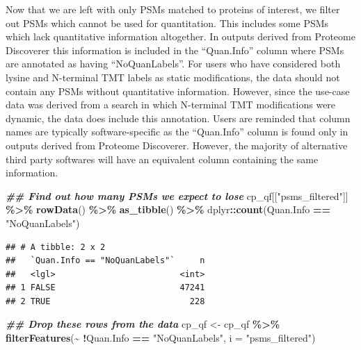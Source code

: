 \documentclass[9pt,a4paper,]{extarticle}
\newenvironment{Shaded}{\begin{snugshade}}{\end{snugshade}}
\newcommand{\AttributeTok}[1]{\textcolor[rgb]{0.13,0.29,0.53}{#1}}
\newcommand{\DocumentationTok}[1]{\textcolor[rgb]{0.56,0.35,0.01}{\textbf{\textit{#1}}}}
\newcommand{\FunctionTok}[1]{\textcolor[rgb]{0.13,0.29,0.53}{\textbf{#1}}}
\newcommand{\NormalTok}[1]{#1}
\newcommand{\OtherTok}[1]{\textcolor[rgb]{0.56,0.35,0.01}{#1}}
\newcommand{\SpecialCharTok}[1]{\textcolor[rgb]{0.81,0.36,0.00}{\textbf{#1}}}
\newcommand{\StringTok}[1]{\textcolor[rgb]{0.31,0.60,0.02}{#1}}
\begin{document}
Now that we are left with only PSMs matched to proteins of interest, we filter
out PSMs which cannot be used for quantitation. This includes some PSMs which
lack quantitative information altogether. In outputs derived from Proteome
Discoverer this information is included in the ``Quan.Info'' column where PSMs are
annotated as having ``NoQuanLabels''. For users who have considered both lysine and
N-terminal TMT labels as static modifications, the data should not contain any
PSMs without quantitative information. However, since the use-case data was
derived from a search in which N-terminal TMT modifications were dynamic, the
data does include this annotation. Users are reminded that column names are
typically software-specific as the ``Quan.Info'' column is found only in outputs
derived from Proteome Discoverer. However, the majority of alternative third
party softwares will have an equivalent column containing the same information.

\begin{Shaded}
\begin{Highlighting}[]
\DocumentationTok{\#\# Find out how many PSMs we expect to lose}
\NormalTok{cp\_qf[[}\StringTok{"psms\_filtered"}\NormalTok{]] }\SpecialCharTok{\%\textgreater{}\%} 
  \FunctionTok{rowData}\NormalTok{() }\SpecialCharTok{\%\textgreater{}\%} 
  \FunctionTok{as\_tibble}\NormalTok{() }\SpecialCharTok{\%\textgreater{}\%} 
\NormalTok{  dplyr}\SpecialCharTok{::}\FunctionTok{count}\NormalTok{(Quan.Info }\SpecialCharTok{==} \StringTok{"NoQuanLabels"}\NormalTok{)}
\end{Highlighting}
\end{Shaded}

\begin{verbatim}
## # A tibble: 2 x 2
##   `Quan.Info == "NoQuanLabels"`     n
##   <lgl>                         <int>
## 1 FALSE                         47241
## 2 TRUE                            228
\end{verbatim}

\begin{Shaded}
\begin{Highlighting}[]
\DocumentationTok{\#\# Drop these rows from the data}
\NormalTok{cp\_qf }\OtherTok{\textless{}{-}}\NormalTok{ cp\_qf }\SpecialCharTok{\%\textgreater{}\%}
  \FunctionTok{filterFeatures}\NormalTok{(}\SpecialCharTok{\textasciitilde{}} \SpecialCharTok{!}\NormalTok{Quan.Info }\SpecialCharTok{==} \StringTok{"NoQuanLabels"}\NormalTok{, }
                 \AttributeTok{i =} \StringTok{"psms\_filtered"}\NormalTok{)}
\end{Highlighting}
\end{Shaded}
\end{document}
